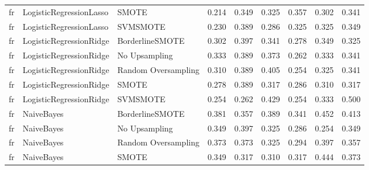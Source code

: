 \begin{tabular}{lllllllll}
      fr &      LogisticRegressionLasso &               SMOTE &     0.214 &                     0.349 &                 0.325 &                  0.357 &                                   0.302 &     0.341 \\
      fr &      LogisticRegressionLasso &            SVMSMOTE &     0.230 &                     0.389 &                 0.286 &                  0.325 &                                   0.325 &     0.349 \\
      fr &      LogisticRegressionRidge &     BorderlineSMOTE &     0.302 &                     0.397 &                 0.341 &                  0.278 &                                   0.349 &     0.325 \\
      fr &      LogisticRegressionRidge &       No Upsampling &     0.333 &                     0.389 &                 0.373 &                  0.262 &                                   0.333 &     0.341 \\
      fr &      LogisticRegressionRidge & Random Oversampling &     0.310 &                     0.389 &                 0.405 &                  0.254 &                                   0.325 &     0.341 \\
      fr &      LogisticRegressionRidge &               SMOTE &     0.278 &                     0.389 &                 0.317 &                  0.286 &                                   0.310 &     0.317 \\
      fr &      LogisticRegressionRidge &            SVMSMOTE &     0.254 &                     0.262 &                 0.429 &                  0.254 &                                   0.333 &     0.500 \\
      fr &                   NaiveBayes &     BorderlineSMOTE &     0.381 &                     0.357 &                 0.389 &                  0.341 &                                   0.452 &     0.413 \\
      fr &                   NaiveBayes &       No Upsampling &     0.349 &                     0.397 &                 0.325 &                  0.286 &                                   0.254 &     0.349 \\
      fr &                   NaiveBayes & Random Oversampling &     0.373 &                     0.373 &                 0.325 &                  0.294 &                                   0.397 &     0.357 \\
      fr &                   NaiveBayes &               SMOTE &     0.349 &                     0.317 &                 0.310 &                  0.317 &                                   0.444 &     0.373 \\

\end{tabular}
